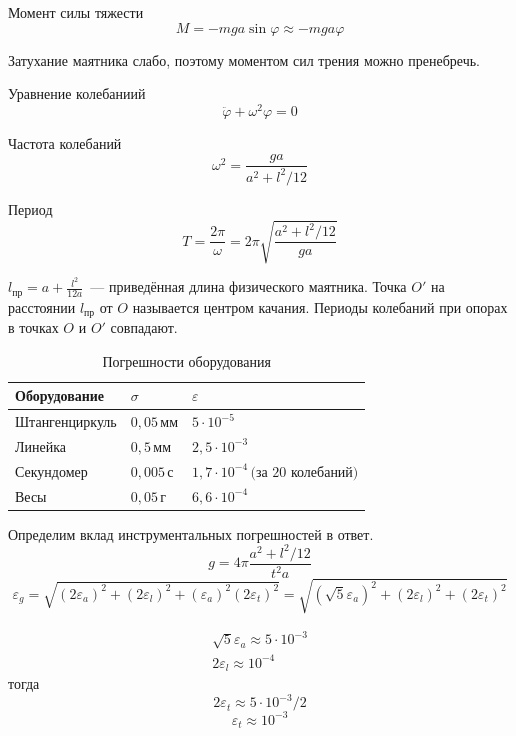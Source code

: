 Момент силы тяжести
\[M=-mga\sin\varphi\approx -mga\varphi\]

Затухание маятника слабо, поэтому моментом сил трения можно пренебречь.

Уравнение колебаниий
\[\ddot{\varphi}+\omega^2\varphi=0\]

Частота колебаний
\[\omega^2=\frac{ga}{a^2+l^2/12}\]

Период 
\[T=\frac{2\pi}{\omega}=2\pi\sqrt{\frac{a^2+l^2/12}{ga}}\]

$l_\text{пр}=a+\frac{l^2}{12a}$~--- приведённая длина физического маятника.
Точка $O'$ на расстоянии $l_\text{пр}$ от $O$ называется центром качания.
Периоды колебаний при опорах в точках $O$ и $O'$ совпадают.

\begin{table}[]
    \caption{Погрешности оборудования}
    \begin{tabular}{|l|l|l|}
    \hline
    Оборудование   & $\sigma$            & $\varepsilon$       \\ \hline
    Штангенциркуль & $0{,}05\,\text{мм}$ & $5\cdot10^{-5}$     \\ \hline
    Линейка        & $0{,}5\,\text{мм}$  & $2{,}5\cdot10^{-3}$ \\ \hline
    Секундомер     & $0{,}005\,\text{с}$ & $1{,}7\cdot10^{-4}\,\text{(за 20 колебаний)}$ \\ \hline
    Весы           & $0{,}05\,\text{г}$  & $6{,}6\cdot10^{-4}$ \\ \hline
    \end{tabular}
\end{table}

Определим вклад инструментальных погрешностей в ответ.
\[g=4\pi\frac{a^2+l^2/12}{t^2a}\]
\[\varepsilon_g=\sqrt{\left(2\varepsilon_a\right)^2+\left(2\varepsilon_l\right)^2+\left(\varepsilon_a\right)^2\left(2\varepsilon_t\right)^2}=
\sqrt{\left(\sqrt{5}\varepsilon_a\right)^2+\left(2\varepsilon_l\right)^2+\left(2\varepsilon_t\right)^2}\]

\begin{gather*}
    \sqrt{5}\varepsilon_a\approx 5\cdot10^{-3} \\
    2\varepsilon_l\approx 10^{-4}
\end{gather*}
тогда
\[2\varepsilon_t\approx 5\cdot10^{-3}/2\]
\[\varepsilon_t\approx 10^{-3}\]

